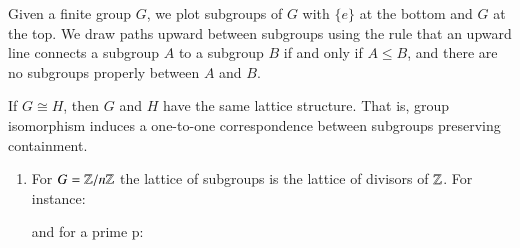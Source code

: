 \documentclass[12pt, a4paper, oneside, openright, titlepage]{book}
\begin{document}
\begin{cons}
    Given a finite group $G$, we plot subgroups of $G$ with $\{e\}$ at the bottom and $G$ at the top. We draw paths upward between subgroups using the rule that an upward line connects a subgroup $A$ to a subgroup $B$ if and only if $A \leq B$, and there are no subgroups properly between $A$ and $B$.
\end{cons}

\begin{rmk}
    If $G \cong H$, then $G$ and $H$ have the same lattice structure. That is, group isomorphism induces a one-to-one correspondence between subgroups preserving containment.
\end{rmk}

\begin{eg}
    \leavevmode
    \begin{enumerate}
        \item For $G = \mathbb Z/n\mathbb Z$ the lattice of subgroups is the lattice of divisors of $\mathbb Z$. For instance: 
        \begin{figure}[H]
            \centering
            \label{fig:Z12Lattice}
        \end{figure}
        and for a prime p:
        \begin{figure}[H]
            \centering
            \label{fig:ZpLattice}

\end{figure}
\end{enumerate}
\end{eg}
\end{document}
